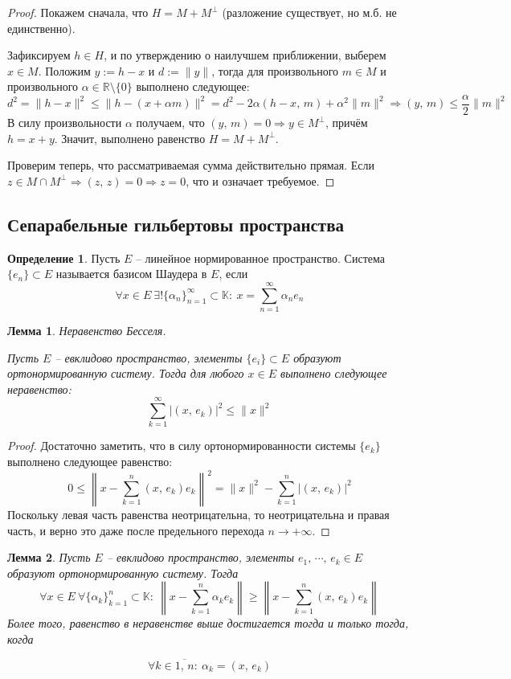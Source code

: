 \documentclass[a4paper,12pt]{article}
\renewcommand{\leq}{\ensuremath{\leqslant}}
\renewcommand{\geq}{\ensuremath{\geqslant}}
\theoremstyle{plain}
\newtheorem{lemma}{Лемма}[section]
\theoremstyle{definition}
\newtheorem{definition}{Определение}[section]
\theoremstyle{remark}
\begin{document}
\begin{proof}
	Покажем сначала, что $H = M + M^\bot$ (разложение существует, но м.б. не единственно).

	Зафиксируем $h \in H$, и по утверждению о наилучшем приближении, выберем $x \in M$. Положим $y := h - x$ и $d := \|y\|$, тогда для произвольного $m \in M$ и произвольного $\alpha \in \mathbb{R}\setminus \{0\}$ выполнено следующее:
	\[
		d^2 = \|h - x\|^2 \leq \|h - (x + \alpha m)\|^2 = d^2 - 2\alpha(h - x,\, m) + \alpha^2\|m\|^2 \Rightarrow (y,\, m) \leq \frac{\alpha}{2}\|m\|^2
	\]
	В силу произвольности $\alpha$ получаем, что $(y,\, m) = 0 \Rightarrow y \in M^\bot$, причём $h = x+ y$. Значит, выполнено равенство $H = M + M^\bot$.

	Проверим теперь, что рассматриваемая сумма действительно прямая. Если $z \in M \cap M^\bot \Rightarrow (z,\,z) = 0 \Rightarrow z = 0$, что и означает требуемое.
\end{proof}

\subsection{Сепарабельные гильбертовы пространства}
\begin{definition}
	Пусть $E$ -- линейное нормированное пространство. Система $\{e_n\} \subset E$ называется базисом Шаудера в $E$, если
	\[
		\forall x \in E \: \exists! \{\alpha_n\}_{n = 1}^\infty \subset \mathbb{K} :\: x = \sum_{n = 1}^\infty \alpha_ne_n
	\]
\end{definition}

\begin{lemma}
	Неравенство Бесселя.

	Пусть $E$ -- евклидово пространство, элементы $\{e_i\} \subset E$ образуют ортонормированную систему. Тогда для любого $x \in E$ выполнено следующее неравенство:
	\[
		\sum_{k = 1}^\infty \vert(x,\, e_k)\vert^2 \leq \|x\|^2
	\]
\end{lemma}

\begin{proof}
	Достаточно заметить, что в силу ортонормированности системы $\{e_k\}$ выполнено следующее равенство:
	\[
		0 \leq \left\|x - \sum_{k = 1}^n (x,\, e_k)e_k\right\|^2 = \|x\|^2 - \sum_{k = 1}^n \vert(x,\, e_k)\vert^2
	\]
	Поскольку левая часть равенства неотрицательна, то неотрицательна и правая часть, и верно это даже после предельного перехода $n \to +\infty$.
\end{proof}

\begin{lemma}
	Пусть $E$ -- евклидово пространство, элементы $e_1,\,\cdots,\, e_k \in E$ образуют ортонормированную систему. Тогда
	\[
		\forall x \in E \: \forall \{\alpha_k\}_{k = 1}^n \subset \mathbb{K} :\: \left\|x - \sum_{k =1}^n\alpha_ke_k\right\| \geq \left\|x - \sum_{k = 1}^n(x,\,e_k)e_k\right\|
	\]
	Более того, равенство в неравенстве выше достигается тогда и только тогда, когда

	\[
		\forall k \in \overline{1,\, n} :\: \alpha_k = (x,\, e_k)
	\]
\end{lemma}
\end{document}
